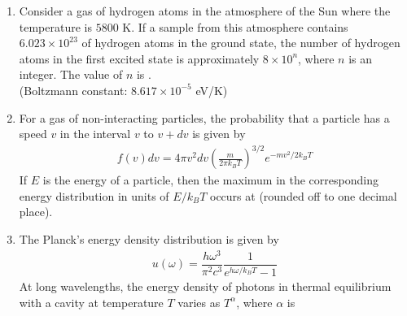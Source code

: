 \documentclass[journal,12pt,onecolumn]{IEEEtran}
\theoremstyle{remark}
\begin{document}
\begin{enumerate}
    \item Consider a gas of hydrogen atoms in the atmosphere of the Sun where the temperature is $5800$ K. If a sample from this atmosphere contains $6.023 \times 10^{23}$ of hydrogen atoms in the ground state, the number of hydrogen atoms in the first excited state is approximately $8 \times 10^n$, where $n$ is an integer. The value of $n$ is \underline{\hspace{2cm}}.\\
    (Boltzmann constant: $8.617 \times 10^{-5}$ eV/K)
    
    \item For a gas of non-interacting particles, the probability that a particle has a speed $v$ in the interval $v$ to $v+dv$ is given by
    \begin{align}
        f(v) dv = 4\pi v^2 dv \left(\frac{m}{2\pi k_B T}\right)^{3/2} e^{-mv^2/2k_B T}
    \end{align}
    If $E$ is the energy of a particle, then the maximum in the corresponding energy distribution in units of $E/k_B T$ occurs at \underline{\hspace{2cm}} (rounded off to one decimal place).
    
    \item The Planck's energy density distribution is given by
    \begin{align}
        u(\omega) = \dfrac{h \omega^3}{\pi^2 c^3} \dfrac{1}{e^{h\omega/k_B T} - 1}
    \end{align}
    At long wavelengths, the energy density of photons in thermal equilibrium with a cavity at temperature $T$ varies as $T^\alpha$, where $\alpha$ is \underline{\hspace{2cm}}
    \end{enumerate}
    
\end{document}
